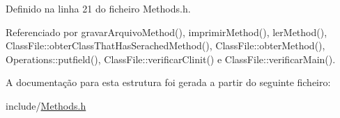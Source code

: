 Definido na linha 21 do ficheiro Methods.\+h.



Referenciado por gravar\+Arquivo\+Method(), imprimir\+Method(), ler\+Method(), Class\+File\+::obter\+Class\+That\+Has\+Serached\+Method(), Class\+File\+::obter\+Method(), Operations\+::putfield(), Class\+File\+::verificar\+Clinit() e Class\+File\+::verificar\+Main().



A documentação para esta estrutura foi gerada a partir do seguinte ficheiro\+:\begin{DoxyCompactItemize}
\item 
include/\hyperlink{Methods_8h}{Methods.\+h}\end{DoxyCompactItemize}
